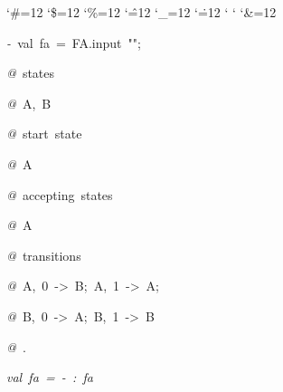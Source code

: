 \begin{list}{}
{\setlength{\leftmargin}{\leftmargini}
\setlength{\rightmargin}{0cm}
\setlength{\itemindent}{0cm}
\setlength{\listparindent}{0cm}
\setlength{\itemsep}{0cm}
\setlength{\parsep}{0cm}
\setlength{\labelsep}{0cm}
\setlength{\labelwidth}{0cm}
\catcode`\#=12
\catcode`\$=12
\catcode`\%=12
\catcode`\^=12
\catcode`\_=12
\catcode`\.=12
\catcode`
\catcode`
\catcode`\&=12
\ttfamily}
\small
\item[]\textsl{-\ }val\ fa\ =\ FA.input\ "";
\item[]\textsl{@\ }states
\item[]\textsl{@\ }A,\ B
\item[]\textsl{@\ }start\ state
\item[]\textsl{@\ }A
\item[]\textsl{@\ }accepting\ states
\item[]\textsl{@\ }A
\item[]\textsl{@\ }transitions
\item[]\textsl{@\ }A,\ 0\ ->\ B;\ A,\ 1\ ->\ A;
\item[]\textsl{@\ }B,\ 0\ ->\ A;\ B,\ 1\ ->\ B
\item[]\textsl{@\ }.
\item[]\textsl{val\ fa\ =\ -\ :\ fa}
\end{list}
